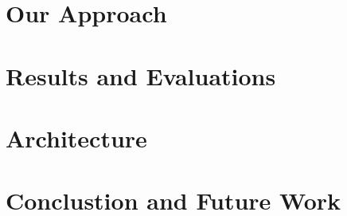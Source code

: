 \documentclass[12pt,twoside]{report}
\begin{document}
\chapter{Our Approach}


\chapter{Results and Evaluations}


\chapter{Architecture}


\chapter{Conclustion and Future Work}



\end{document}

